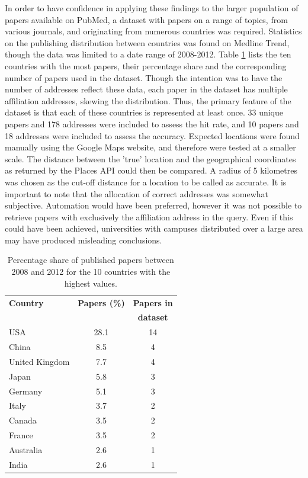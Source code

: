 \documentclass[Report.tex]{subfiles}
\begin{document}
\noindent In order to have confidence in applying these findings to the larger population of papers available on PubMed, a dataset with papers on a range of topics, from various journals, and originating from numerous countries was required. Statistics on the publishing distribution between countries was found on Medline Trend\cite{medlinetrend}, though the data was limited to a date range of 2008-2012. Table \ref{tab:countries} lists the ten countries with the most papers, their percentage share and the corresponding number of papers used in the dataset. Though the intention was to have the number of addresses reflect these data, each paper in the dataset has multiple affiliation addresses, skewing the distribution. Thus, the primary feature of the dataset is that each of these countries is represented at least once. 33 unique papers and 178 addresses were included to assess the hit rate, and 10 papers and 18 addresses were included to assess the accuracy. Expected locations were found manually using the Google Maps website, and therefore were tested at a smaller scale. The distance between the 'true' location and the geographical coordinates as returned by the Places API could then be compared. A radius of 5 kilometres was chosen as the cut-off distance for a location to be called as accurate. It is important to note that the allocation of correct addresses was somewhat subjective. Automation would have been preferred, however it was not possible to retrieve papers with exclusively the affiliation address in the query. Even if this could have been achieved, universities with campuses distributed over a large area may have produced misleading conclusions.\newline

\begin{table}
\begin{center}
    \begin{tabular}{ | l | c | c | }\hline
    \textbf{Country} & \textbf{Papers (\%)} & \textbf{Papers in} \\
     & &\textbf{dataset}\\ \hline
    USA & 28.1 & 14\\ \hline
    China & 8.5 & 4\\ \hline
    United Kingdom & 7.7 & 4\\ \hline
    Japan & 5.8 & 3\\ \hline
    Germany & 5.1 & 3\\ \hline
    Italy & 3.7 & 2\\ \hline
    Canada & 3.5 & 2\\ \hline
    France & 3.5 & 2\\ \hline
    Australia & 2.6 & 1\\ \hline
    India & 2.6 & 1\\ \hline
    \end{tabular}
    \label{tab:countries}
    \caption{Percentage share of published papers between 2008 and 2012 for the 10 countries with the highest values.}
\end{center}
\end{table}
\end{document}
